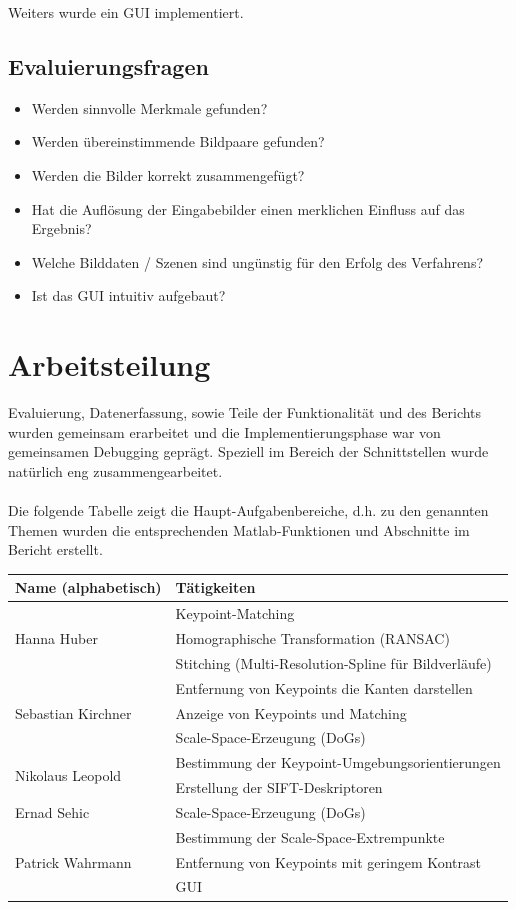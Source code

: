 \documentclass[deutsch]{scrartcl}
\begin{document}
Weiters wurde ein GUI implementiert.

\subsection{Evaluierungsfragen}
\begin{itemize}
	\item Werden sinnvolle Merkmale gefunden?
	\item Werden übereinstimmende Bildpaare gefunden?
	\item Werden die Bilder korrekt zusammengefügt?
	\item Hat die Auflösung der Eingabebilder einen merklichen Einfluss auf das Ergebnis?
	\item Welche Bilddaten / Szenen sind ungünstig für den Erfolg des Verfahrens?
	\item Ist das GUI intuitiv aufgebaut?
\end{itemize}



\newpage
\section{Arbeitsteilung}
Evaluierung, Datenerfassung, sowie Teile der Funktionalität und des Berichts
wurden gemeinsam erarbeitet und die Implementierungsphase war von gemeinsamen
Debugging geprägt. Speziell im Bereich der Schnittstellen wurde natürlich eng zusammengearbeitet.\\\\Die folgende Tabelle zeigt die Haupt-Aufgabenbereiche, d.h. zu den genannten Themen wurden die entsprechenden Matlab-Funktionen und Abschnitte im Bericht erstellt.
\begin{center}
  \begin{tabular}{ |l|l| }
    \hline
  Name (alphabetisch) & Tätigkeiten\\
    \hline
    \multirow{3}{*}{Hanna Huber} & Keypoint-Matching \\ & Homographische Transformation (RANSAC)\\ & Stitching (Multi-Resolution-Spline für Bildverläufe)\\ \hline
    \multirow{3}{*}{Sebastian Kirchner} & Entfernung von Keypoints die Kanten darstellen\\  & Anzeige von Keypoints und Matching\\ & Scale-Space-Erzeugung (DoGs)\\\hline
    \multirow{2}{*}{Nikolaus Leopold} & Bestimmung der Keypoint-Umgebungsorientierungen\\ & Erstellung der SIFT-Deskriptoren\\ \hline
    \multirow{1}{*}{Ernad Sehic} & Scale-Space-Erzeugung (DoGs)\\ \hline
    \multirow{3}{*}{Patrick Wahrmann} & Bestimmung der Scale-Space-Extrempunkte\\ & Entfernung von Keypoints mit geringem Kontrast\\ & GUI\\ \hline
  \end{tabular}
\end{center}
\end{document}
